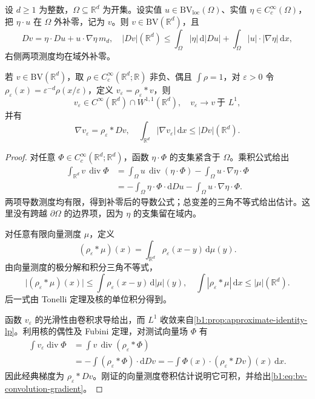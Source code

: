 \begin{lemma}\label{b1:lem:bv-cutoff-and-mollification}
设 \(d\ge1\) 为整数，\(\Omega\subseteq\mathbb R^d\) 为开集。设实值 \(u\in \mathrm{BV}_{\mathrm{loc}}(\Omega)\)、实值 \(\eta\in C_c^\infty(\Omega)\)，把 \(\eta\cdot u\) 在 \(\Omega\) 外补零，记为 \(v\)。则 \(v\in \mathrm{BV}(\mathbb R^d)\)，且
\begin{equation}\label{b1:eq:bv-cutoff-derivative}
 Dv=\eta\cdot Du+u\cdot\nabla\eta\,m_d,
 \quad
 |Dv|(\mathbb R^d)
 \leq\int_\Omega|\eta|\,\mathrm d|Du|
       +\int_\Omega|u|\cdot|\nabla\eta|\,\mathrm dx,
\end{equation}
右侧两项测度均在域外补零。

\ProseParagraphBreak

若 \(v\in \mathrm{BV}(\mathbb R^d)\)，取 \(\rho\in C_c^\infty(\mathbb R^d;\mathbb R)\) 非负、偶且 \(\int\rho=1\)，对 \(\varepsilon>0\) 令 \(\rho_\varepsilon(x)=\varepsilon^{-d}\rho(x/\varepsilon)\)，定义
\(v_\varepsilon=\rho_\varepsilon*v\)，则
\[
 v_\varepsilon\in C^\infty(\mathbb R^d)\cap W^{1,1}(\mathbb R^d),
 \quad v_\varepsilon\longrightarrow v\ \text{于 }L^1,
\]
并有
\begin{equation}\label{b1:eq:bv-convolution-gradient}
 \nabla v_\varepsilon=\rho_\varepsilon*Dv,\quad
 \int_{\mathbb R^d}|\nabla v_\varepsilon|\,\mathrm dx
 \leq|Dv|(\mathbb R^d).
\end{equation}
\end{lemma}
\begin{proof}
对任意 \(\Phi\in C_c^\infty(\mathbb R^d;\mathbb R^d)\)，函数
\(\eta\cdot\Phi\) 的支集紧含于 \(\Omega\)。乘积公式给出
\[
 \begin{aligned}
 \int_{\mathbb R^d}v\,\operatorname{div}\Phi
 &=\int_\Omega u\,\operatorname{div}(\eta\cdot\Phi)
       -\int_\Omega u\cdot\nabla\eta\cdot\Phi\\
 &=-\int_\Omega\eta\cdot\Phi\cdot\mathrm dDu
       -\int_\Omega u\cdot\nabla\eta\cdot\Phi.
 \end{aligned}
\]
两项导数测度均有限，得到补零后的导数公式；总变差的三角不等式给出估计。这里没有跨越 \(\partial\Omega\) 的边界项，因为 \(\eta\) 的支集留在域内。

对任意有限向量测度 \(\mu\)，定义
\[
 (\rho_\varepsilon*\mu)(x)
 =\int_{\mathbb R^d}\rho_\varepsilon(x-y)\,\mathrm d\mu(y).
\]
由向量测度的极分解和积分三角不等式，
\[
 \bigl|(\rho_\varepsilon*\mu)(x)\bigr|
 \leq\int\rho_\varepsilon(x-y)\,\mathrm d|\mu|(y),
 \quad
 \int|\rho_\varepsilon*\mu|\,\mathrm dx\leq|\mu|(\mathbb R^d).
\]
后一式由 Tonelli 定理及核的单位积分得到。

函数 \(v_\varepsilon\) 的光滑性由卷积求导给出，而 \(L^1\) 收敛来自\cref{b1:prop:approximate-identity-lp}。利用核的偶性及 Fubini 定理，对测试向量场 \(\Phi\) 有
\[
 \begin{aligned}
 \int v_\varepsilon\operatorname{div}\Phi
 &=\int v\,\operatorname{div}(\rho_\varepsilon*\Phi)\\
 &=-\int(\rho_\varepsilon*\Phi)\cdot\mathrm dDv
 =-\int\Phi(x)\cdot(\rho_\varepsilon*Dv)(x)\,\mathrm dx.
 \end{aligned}
\]
因此经典梯度为 \(\rho_\varepsilon*Dv\)。刚证的向量测度卷积估计说明它可积，并给出\eqref{b1:eq:bv-convolution-gradient}。
\end{proof}

